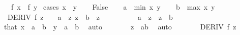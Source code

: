 \begin{isabellebody}
\ \ \ {\isachardoublequoteopen}f\ x\ {\isacharequal}{\kern0pt}\ f\ y{\isachardoublequoteclose}\isanewline
%
\isadelimproof
%
\endisadelimproof
%
\isatagproof
{}\isamarkupfalse%
\ {\isacharparenleft}{\kern0pt}cases\ {\isachardoublequoteopen}x\ {\isacharequal}{\kern0pt}\ y{\isachardoublequoteclose}{\isacharparenright}{\kern0pt}\isanewline
\ \ \isamarkupfalse%
\ False\isanewline
\ \ \isamarkupfalse%
\ {\isacharquery}{\kern0pt}a\ {\isacharequal}{\kern0pt}\ {\isachardoublequoteopen}min\ x\ y{\isachardoublequoteclose}\isanewline
\ \ \isamarkupfalse%
\ {\isacharquery}{\kern0pt}b\ {\isacharequal}{\kern0pt}\ {\isachardoublequoteopen}max\ x\ y{\isachardoublequoteclose}\isanewline
\ \ \isamarkupfalse%
\ {\isacharasterisk}{\kern0pt}{\isacharcolon}{\kern0pt}\ {\isachardoublequoteopen}DERIV\ f\ z\ {\isacharcolon}{\kern0pt}{\isachargreater}{\kern0pt}\ {}{\isachardoublequoteclose}\ \ {\isachardoublequoteopen}{\isacharquery}{\kern0pt}a\ {\isasymle}\ z{\isachardoublequoteclose}\ {\isachardoublequoteopen}z\ {\isasymle}\ {\isacharquery}{\kern0pt}b{\isachardoublequoteclose}\ \ z\isanewline
\ \ \isamarkupfalse%
\ {\isacharminus}{\kern0pt}\isanewline
\ \ \ \ \isamarkupfalse%
\ {\isachardoublequoteopen}a\ {\isacharless}{\kern0pt}\ z{\isachardoublequoteclose}\ \ {\isachardoublequoteopen}z\ {\isacharless}{\kern0pt}\ b{\isachardoublequoteclose}\isanewline
\ \ \ \ \ \ \isamarkupfalse%
\ that\ {\isacartoucheopen}x\ {\isasymin}\ {\isacharbraceleft}{\kern0pt}a\ {\isacharless}{\kern0pt}{\isachardot}{\kern0pt}{\isachardot}{\kern0pt}{\isacharless}{\kern0pt}\ b{\isacharbraceright}{\kern0pt}{\isacartoucheclose}\ \ {\isacartoucheopen}y\ {\isasymin}\ {\isacharbraceleft}{\kern0pt}a\ {\isacharless}{\kern0pt}{\isachardot}{\kern0pt}{\isachardot}{\kern0pt}{\isacharless}{\kern0pt}\ b{\isacharbraceright}{\kern0pt}{\isacartoucheclose}\ \isamarkupfalse%
\ auto\isanewline
\ \ \ \ \isamarkupfalse%
\ \isamarkupfalse%
\ {\isachardoublequoteopen}z\ {\isasymin}\ {\isacharbraceleft}{\kern0pt}a{\isacharless}{\kern0pt}{\isachardot}{\kern0pt}{\isachardot}{\kern0pt}{\isacharless}{\kern0pt}b{\isacharbraceright}{\kern0pt}{\isachardoublequoteclose}\ \isamarkupfalse%
\ auto\isanewline
\ \ \ \ \isamarkupfalse%
\ \isamarkupfalse%
\ {\isachardoublequoteopen}DERIV\ f\ z\ {\isacharcolon}{\kern0pt}{\isachargreater}{\kern0pt}\ {}{\isachardoublequoteclose}\ \isamarkupfalse%

\end{isabellebody}

